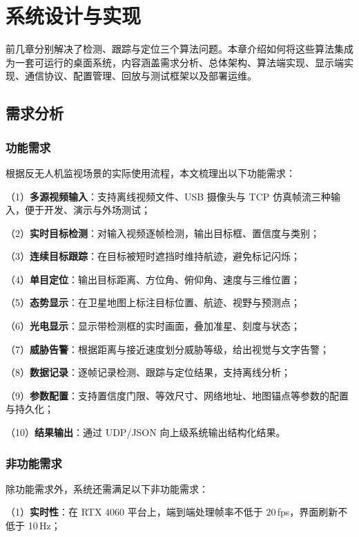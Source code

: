 \chapter{系统设计与实现}

前几章分别解决了检测、跟踪与定位三个算法问题。本章介绍如何将这些算法集成为一套可运行的桌面系统，内容涵盖需求分析、总体架构、算法端实现、显示端实现、通信协议、配置管理、回放与测试框架以及部署运维。

\section{需求分析}

\subsection{功能需求}

根据反无人机监视场景的实际使用流程，本文梳理出以下功能需求：

（1）\textbf{多源视频输入}：支持离线视频文件、USB 摄像头与 TCP 仿真帧流三种输入，便于开发、演示与外场测试；

（2）\textbf{实时目标检测}：对输入视频逐帧检测，输出目标框、置信度与类别；

（3）\textbf{连续目标跟踪}：在目标被短时遮挡时维持航迹，避免标记闪烁；

（4）\textbf{单目定位}：输出目标距离、方位角、俯仰角、速度与三维位置；

（5）\textbf{态势显示}：在卫星地图上标注目标位置、航迹、视野与预测点；

（6）\textbf{光电显示}：显示带检测框的实时画面，叠加准星、刻度与状态；

（7）\textbf{威胁告警}：根据距离与接近速度划分威胁等级，给出视觉与文字告警；

（8）\textbf{数据记录}：逐帧记录检测、跟踪与定位结果，支持离线分析；

（9）\textbf{参数配置}：支持置信度门限、等效尺寸、网络地址、地图锚点等参数的配置与持久化；

（10）\textbf{结果输出}：通过 UDP/JSON 向上级系统输出结构化结果。

\subsection{非功能需求}

除功能需求外，系统还需满足以下非功能需求：

（1）\textbf{实时性}：在 RTX 4060 平台上，端到端处理帧率不低于 20\,fps，界面刷新不低于 10\,Hz；

